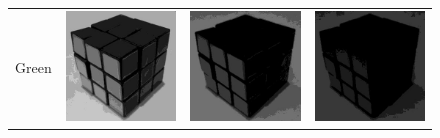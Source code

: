 \begin{figure}
\begin{tabular}{rccc}
         Green &
         \includegraphics[width=\rubiklength]{img/rubik/1_rgb_g.jpg} & 
         \includegraphics[width=\rubiklength]{img/rubik/2_rgb_g.jpg} & \includegraphics[width=\rubiklength]{img/rubik/3_rgb_g.jpg}\\
         

\end{tabular}
\end{figure}
